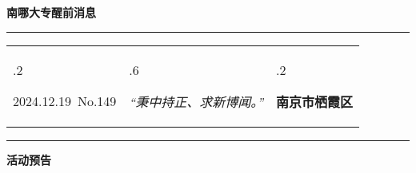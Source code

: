 \documentclass[letterpaper, 12pt]{article}
\begin{document}
\begin{center}
    \Huge\textbf{南哪大专醒前消息}
\end{center}
\vspace{4mm}
\hrule
\renewcommand\tabularxcolumn[1]{m{#1}}
\begin{tabularx}{\textwidth}{>{\hsize.2\hsize}X>{\hsize.6\hsize}X>{\hsize.2\hsize}X}
    \begin{flushleft}
        2024.12.19\, No.149
    \end{flushleft}
    &
    \begin{center}
        \textit{“秉中持正、求新博闻。”}
    \end{center}
    &
    \begin{flushright}
        \textbf{南京市栖霞区}
    \end{flushright}
\end{tabularx}
\vspace{-3.5mm}
\hrule
\vspace{4mm}
\centerline{\huge\textbf{活动预告}}
\end{document}
